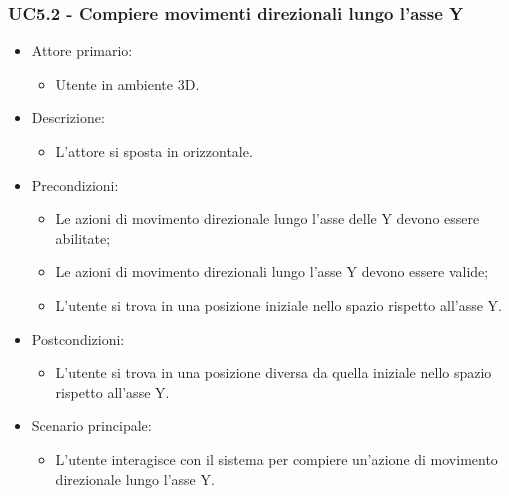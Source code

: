 \subsubsection{UC5.2 - Compiere movimenti direzionali lungo l'asse Y}
\begin{itemize}

	\item Attore primario: 
	\begin{itemize}
		\item Utente in ambiente 3D.
	\end{itemize}
	\item Descrizione:
	\begin{itemize}
		\item L'attore si sposta in orizzontale.
	\end{itemize}
	
	\item Precondizioni:
	\begin{itemize}
		\item Le azioni di movimento direzionale lungo l'asse delle Y devono essere abilitate;
		\item Le azioni di movimento direzionali lungo l'asse Y devono essere valide;
		\item L'utente si trova in una posizione iniziale nello spazio rispetto all'asse Y.
	\end{itemize}
	
	\item Postcondizioni:
	\begin{itemize}
		\item L'utente si trova in una posizione diversa da quella iniziale nello spazio rispetto all'asse Y.
	\end{itemize}
	
	\item Scenario principale:
	\begin{itemize}
		\item L'utente interagisce con il sistema per compiere un'azione di movimento direzionale lungo l'asse Y.
	\end{itemize}
	
\end{itemize}

